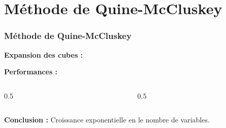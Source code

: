 \documentclass[handout]{beamer}
\newcommand{\tick}{\ding{52}}
\begin{document}
\section{M\'ethode de Quine-McCluskey}
\begin{frame}
  \frametitle{M\'ethode de Quine-McCluskey}
  
  \textbf{Expansion des cubes :}
  
     \begin{tikzpicture}[scale=2]
     
     \end{tikzpicture}
     \vfill\null

  \textbf{Performances :}     
     
     \begin{columns}
     	\begin{column}[t]{0.5\hsize}
	     \begin{tikzpicture}[scale=0.8]
    	 
	     \end{tikzpicture}
	     \end{column}

     
	     \begin{column}[t]{0.5\hsize}
	     \begin{tikzpicture}[scale=0.8]
    	 
	     \end{tikzpicture}
    	 \end{column} 
	  \end{columns}
	  
	\vfill\null
	\textbf{Conclusion : } Croissance exponentielle en le nombre de variables.
	  
%
%  
  
  
  
\end{frame}
\end{document}
